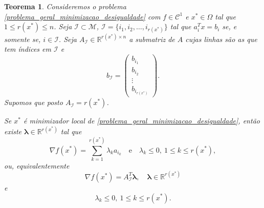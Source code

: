\documentclass[12pt,a4paper]{scrartcl}
\def\RR{\mathds{R}}
\newtheorem{teo}{Teorema}
\theoremstyle{definition}%
\begin{document}
\begin{teo} \label{teo:condicao_necessaria_1ordem_restricao_desigualdade}
Consideremos o problema \eqref{problema_geral_minimizacao_desigualdade} com $f \in \mathcal{C}^{1}$ e $x^{*} \in \Omega$ tal que $1 \leq r(x^{*}) \leq n$. Seja $\mathcal{I} \subset \mathcal{M}$, $\mathcal{I} = \{ i_{1}, i_{2}, \ldots , i_{r(x^{*})} \}$ tal que $a_{i}^{T}x = b_{i}$ se, e somente se, $i\in \mathcal{I}$. Seja $A_{\mathcal{I}} \in \RR^{r(x^{*})\times n}$ a submatriz de $A$ cujas linhas são as que tem índices em $\mathcal{I}$ e 
\[
b_{\mathcal{I}} = \left( \begin{array}{cc} b_{i_{1}} \\ b_{i_{2}} \\ \vdots \\ b_{i_{r(x^{*})}} \end{array} \right) .
\]
Supomos que posto $A_{\mathcal{I}} = r(x^{*})$.

Se $x^{*}$ é minimizador local de \eqref{problema_geral_minimizacao_desigualdade}, então existe $\boldsymbol{\lambda} \in \RR^{r(x^{*})}$ tal que 
\[
\nabla f(x^{*}) = \sum_{k=1}^{r(x^{*})} \lambda_{k} a_{i_{k}} \quad \text{e} \quad \lambda_{k} \leq 0, \ 1\leq k\leq r(x^{*}),
\]
ou, equivalentemente
\[ \label{eq:condicao_necessaria_1ordem_restricao_desigualdade}
\nabla f(x^{*}) = A_{\mathcal{I}}^{T} \boldsymbol{\lambda}, \quad \boldsymbol{\lambda} \in \RR^{r(x^{*})}
\]
e
\[
\lambda_{k} \leq 0, \ 1\leq k\leq r(x^{*}).
\]
\end{teo}
\end{document}
